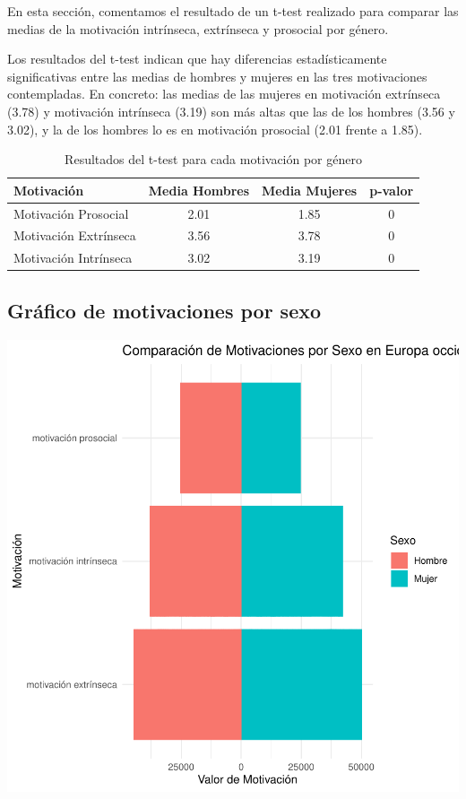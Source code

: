 \documentclass{article}
\begin{document}
En esta sección, comentamos el resultado de un t-test realizado para comparar las medias de la motivación intrínseca, extrínseca y prosocial por género.


Los resultados del t-test indican que hay diferencias estadísticamente significativas entre las medias de hombres y mujeres en las tres motivaciones contempladas. En concreto: las medias de las mujeres en motivación extrínseca (3.78) y motivación intrínseca (3.19) son más altas que las de los hombres (3.56 y 3.02), y la de los hombres lo es en motivación prosocial (2.01 frente a 1.85).

\begin{table}[h!]
\centering
\caption{Resultados del t-test para cada motivación por género}
\begin{tabular}{lccc}
  \toprule
  \textbf{Motivación} & \textbf{Media Hombres} & \textbf{Media Mujeres} & \textbf{p-valor} \\
  \midrule
  Motivación Prosocial & 2.01 & 1.85 & 0 \\
  Motivación Extrínseca & 3.56 & 3.78 & 0 \\
  Motivación Intrínseca & 3.02 & 3.19 & 0 \\
  \bottomrule
\end{tabular}
\end{table}


\subsection{Gráfico de motivaciones por sexo}

\includegraphics{Ejemplo-004}
\end{document}
